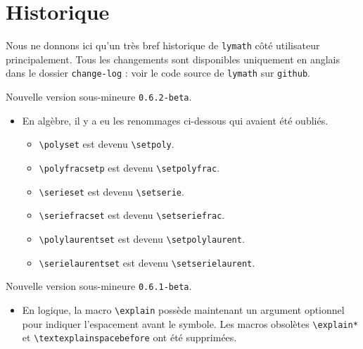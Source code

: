 \documentclass[12pt,a4paper]{article}
\begin{document}
\newpage

\section{Historique}

Nous ne donnons ici qu'un très bref historique de \verb+lymath+ côté utilisateur principalement.
Tous les changements sont disponibles uniquement en anglais dans le dossier \verb+change-log+ : voir le code source de \verb+lymath+ sur \verb+github+.

\begin{description}[leftmargin=1em]
    \setlength\itemsep{1em}



    \item[2019-10-14] Nouvelle version sous-mineure \verb+0.6.2-beta+.
    \begin{itemize}
        \item En algèbre, il y a eu les renommages ci-dessous qui avaient été oubliés.
        \begin{itemize}
        	\item \verb+\polyset+ est devenu \verb+\setpoly+.

        	\item \verb+\polyfracsetp+ est devenu \verb+\setpolyfrac+.

        	\item \verb+\serieset+ est devenu \verb+\setserie+.

        	\item \verb+\seriefracset+ est devenu \verb+\setseriefrac+.

        	\item \verb+\polylaurentset+ est devenu \verb+\setpolylaurent+.

        	\item \verb+\serielaurentset+ est devenu \verb+\setserielaurent+.
        \end{itemize}
    \end{itemize} 



    \item[2019-10-13] Nouvelle version sous-mineure \verb+0.6.1-beta+.
    \begin{itemize}
        \item En logique, la macro \verb+\explain+ possède maintenant un argument optionnel pour indiquer l'espacement avant le symbole. Les macros obsolètes \verb+\explain*+ et \verb+\textexplainspacebefore+ ont été supprimées.


\end{itemize}
\end{description}
\end{document}

